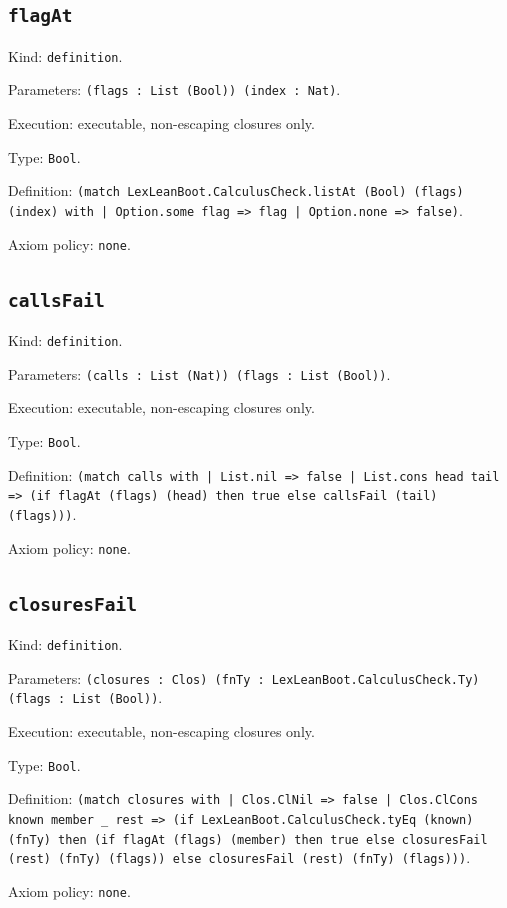 \documentclass[11pt]{article}
\begin{document}
\subsection*{\texttt{flagAt}}
\noindent Kind: \texttt{definition}.\par
\noindent Parameters: \texttt{(flags : List (Bool)) (index : Nat)}.\par
\noindent Execution: executable, non-escaping closures only.\par
\noindent Type: \texttt{Bool}.\par
\noindent Definition: \texttt{(match LexLeanBoot.CalculusCheck.listAt (Bool) (flags) (index) with | Option.some flag => flag | Option.none => false)}.\par
\noindent Axiom policy: \texttt{none}.\par
\subsection*{\texttt{callsFail}}
\noindent Kind: \texttt{definition}.\par
\noindent Parameters: \texttt{(calls : List (Nat)) (flags : List (Bool))}.\par
\noindent Execution: executable, non-escaping closures only.\par
\noindent Type: \texttt{Bool}.\par
\noindent Definition: \texttt{(match calls with | List.nil => false | List.cons head tail => (if flagAt (flags) (head) then true else callsFail (tail) (flags)))}.\par
\noindent Axiom policy: \texttt{none}.\par
\subsection*{\texttt{closuresFail}}
\noindent Kind: \texttt{definition}.\par
\noindent Parameters: \texttt{(closures : Clos) (fnTy : LexLeanBoot.CalculusCheck.Ty) (flags : List (Bool))}.\par
\noindent Execution: executable, non-escaping closures only.\par
\noindent Type: \texttt{Bool}.\par
\noindent Definition: \texttt{(match closures with | Clos.ClNil => false | Clos.ClCons known member \_ rest => (if LexLeanBoot.CalculusCheck.tyEq (known) (fnTy) then (if flagAt (flags) (member) then true else closuresFail (rest) (fnTy) (flags)) else closuresFail (rest) (fnTy) (flags)))}.\par
\noindent Axiom policy: \texttt{none}.\par
\end{document}

